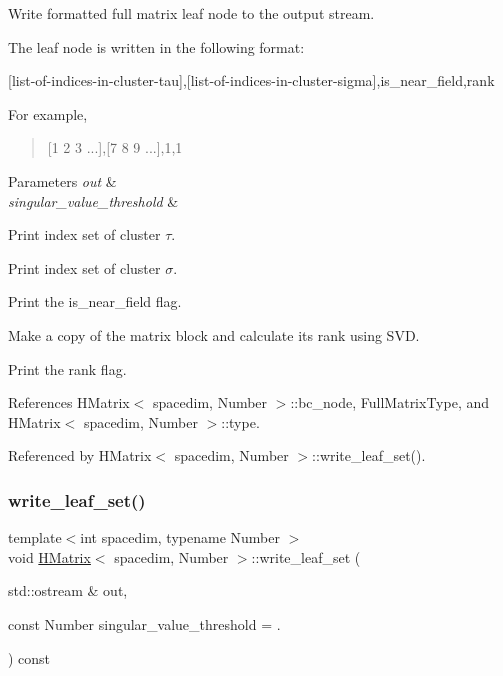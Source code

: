 Write formatted full matrix leaf node to the output stream.

The leaf node is written in the following format\+:

\begin{quote}


\end{quote}
\mbox{[}list-\/of-\/indices-\/in-\/cluster-\/tau\mbox{]},\mbox{[}list-\/of-\/indices-\/in-\/cluster-\/sigma\mbox{]},is\+\_\+near\+\_\+field,rank

For example,

\begin{quote}
\mbox{[}1 2 3 ...\mbox{]},\mbox{[}7 8 9 ...\mbox{]},1,1 \end{quote}



\begin{DoxyParams}{Parameters}
{\em out} & \\
\hline
{\em singular\+\_\+value\+\_\+threshold} & \\
\hline
\end{DoxyParams}
Print index set of cluster $\tau$.

Print index set of cluster $\sigma$.

Print the {\ttfamily is\+\_\+near\+\_\+field} flag.

Make a copy of the matrix block and calculate its rank using S\+VD.

Print the {\ttfamily rank} flag.

References H\+Matrix$<$ spacedim, Number $>$\+::bc\+\_\+node, Full\+Matrix\+Type, and H\+Matrix$<$ spacedim, Number $>$\+::type.



Referenced by H\+Matrix$<$ spacedim, Number $>$\+::write\+\_\+leaf\+\_\+set().

\mbox{\label{classHMatrix_aaf0ae0960a40ad78a941aee823e80315}} 
\subsubsection{\texorpdfstring{write\+\_\+leaf\+\_\+set()}{write\_leaf\_set()}}
{\footnotesize\ttfamily template$<$int spacedim, typename Number $>$ \\
void \hyperlink{classHMatrix}{H\+Matrix}$<$ spacedim, Number $>$\+::write\+\_\+leaf\+\_\+set (\begin{DoxyParamCaption}\item[{std\+::ostream \&}]{out,  }\item[{const Number}]{singular\+\_\+value\+\_\+threshold = {.} }\end{DoxyParamCaption}) const}

